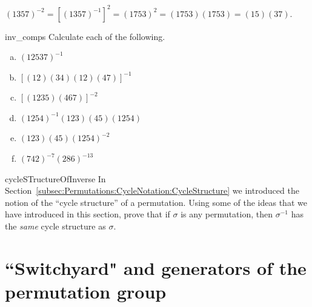 \begin{example}{}
$( 1 3 5 7) ^{-2} = \left[ ( 1 3 5 7 )^{-1} \right]^2 = ( 1 7  5 3 )^2 = ( 1 7 5 3 )(1 7 5 3) = ( 1 5 )(3 7)$. 
\end{example}


\begin{exercise}{inv_comps}
Calculate each of the following.
\begin{multicols}{2}
\begin{enumerate}[(a)]    
\item
$(1 2 5 3 7)^{-1}$
 \item
$[(1 2)(3 4)(1 2)(4 7)]^{-1}$
\item
$[( 1 2 3 5 )( 4 6 7 )]^{-2}$
\item
$( 1 2 5 4 )^{-1} ( 1 2 3 )( 4 5 ) ( 1 2 5 4 )$
\item
$( 1 2 3 )( 4 5 ) ( 1 2 5 4 )^{-2}$
\item
$( 7 4 2 )^{-7} ( 2 8 6)^{-13}$

 \end{enumerate}
\end{multicols}
\end{exercise}

\begin{exercise}{cycleSTructureOfInverse}
In Section~\ref{subsec:Permutations:CycleNotation:CycleStructure} we introduced the notion of the ``cycle structure'' of a permutation. Using some of the ideas that we have introduced in this section, prove that if $\sigma$ is any permutation, then $\sigma^{-1}$ has the \emph{same} cycle structure as $\sigma$.
\end{exercise}


\section{``Switchyard" and generators of the permutation group\quad
{}}
\label{sec:Permutations:SwitchyardAndGenerators}

